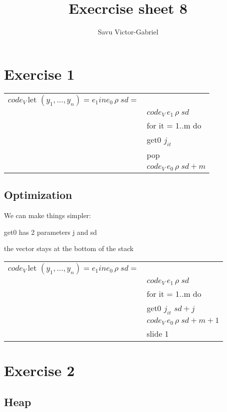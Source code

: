 \documentclass[10pt,a4paper]{article}
\title{Execrcise sheet 8}
\author{Savu Victor-Gabriel}
\begin{document}
	\maketitle
	
	\section{Exercise 1}
	
	\begin{tabular}{l l}
		$code_V \, \text{let } (y_1, ..., y_n) = e_1 in e_0 \, \rho \; sd = $ &\\
		& $code_V \, e_1 \, \rho \; sd$ \\
		& for it = 1..m do \\
		& \hspace{5mm} get0 $j_{it}$ \\
		& pop \\
		& $code_V \, e_0 \, \rho \; sd + m$ \\
	\end{tabular}
	
	\subsection*{Optimization}
	
	We can make things simpler:
	
	get0 has 2 parameters j and sd
	
	the vector stays at the bottom of the stack
	
	\begin{tabular}{l l}
		$code_V \, \text{let } (y_1, ..., y_n) = e_1 in e_0 \, \rho \; sd = $ &\\
		& $code_V \, e_1 \, \rho \; sd$ \\
		& for it = 1..m do \\
		& \hspace{5mm} get0 $j_{it}$ $sd + j$ \\
		& $code_V \, e_0 \, \rho \; sd + m + 1$ \\
		& slide 1 \\
	\end{tabular}
	
	\section{Exercise 2}
	
	\subsection{Heap}
	
\end{document}
